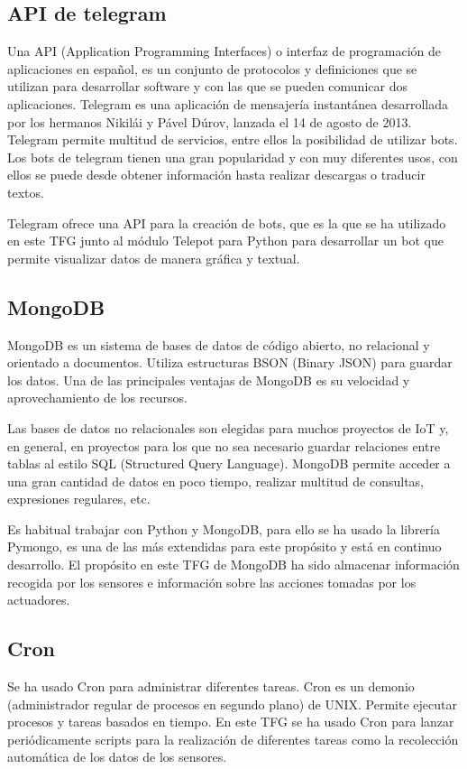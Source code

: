 \documentclass[a4paper, 12pt, oneside]{book}
\begin{document}
\subsection{API de telegram}
\label{subsec:api telegram}

Una API (Application Programming Interfaces) o interfaz de programación de aplicaciones en español, es un conjunto de protocolos y definiciones que se utilizan para desarrollar software y con las que se pueden comunicar dos aplicaciones. Telegram es una aplicación de mensajería instantánea desarrollada por los hermanos Nikilái y Pável Dúrov, lanzada el 14 de agosto de 2013. Telegram permite multitud de servicios, entre ellos la posibilidad de utilizar bots. Los bots de telegram tienen una gran popularidad y con muy diferentes usos, con ellos se puede desde obtener información hasta realizar descargas o traducir textos.

Telegram ofrece una API para la creación de bots, que es la que se ha utilizado en este TFG junto al módulo Telepot para Python para desarrollar un bot que permite visualizar datos de manera gráfica y textual.

\subsection{MongoDB}
\label{subsec:mongodb}

MongoDB es un sistema de bases de datos de código abierto, no relacional y orientado a documentos. Utiliza estructuras BSON (Binary JSON) para guardar los datos. Una de las principales ventajas de MongoDB es su velocidad y aprovechamiento de los recursos.

Las bases de datos no relacionales son elegidas para muchos proyectos de IoT y, en general, en proyectos para los que no sea necesario guardar relaciones entre tablas al estilo SQL (Structured Query Language). MongoDB permite acceder a una gran cantidad de datos en poco tiempo, realizar multitud de consultas, expresiones regulares, etc.

Es habitual trabajar con Python y MongoDB, para ello se ha usado la librería Pymongo, es una de las más extendidas para este propósito y está en continuo desarrollo. El propósito en este TFG de MongoDB ha sido almacenar información recogida por los sensores e información sobre las acciones tomadas por los actuadores.

\subsection{Cron}
\label{subsec: cron}
Se ha usado Cron para administrar diferentes tareas. Cron es un demonio (administrador regular de procesos en segundo plano) de UNIX. Permite ejecutar procesos y tareas basados en tiempo.
En este TFG se ha usado Cron para lanzar periódicamente scripts para la realización de diferentes tareas como la recolección automática de los datos de los sensores.
 
\end{document}
